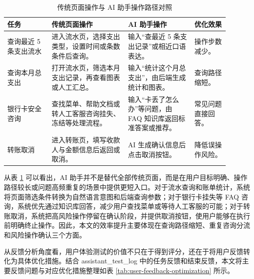 \documentclass[bachelor, print]{xduthesis}
\begin{document}
\begin{table}[H]
    \centering
    \caption{传统页面操作与 AI 助手操作路径对照}
    \label{tab:efficiency-path-comparison}
    \scriptsize
    \setlength{\tabcolsep}{2pt}
    \begin{tabular}{|p{0.18\linewidth}|p{0.31\linewidth}|p{0.27\linewidth}|p{0.14\linewidth}|}
        \hline
        任务 & 传统页面操作 & AI 助手操作 & 优化效果 \\
        \hline
        查询最近 5 条支出流水 & 进入流水页，选择支出类型，设置时间或条数条件后查询。 & 输入“查最近 5 条支出记录”或相近口语表达。 & 操作步数减少。 \\
        \hline
        查询本月总支出 & 打开流水页，筛选本月支出记录，再查看图表或人工汇总。 & 输入“统计这个月总支出”，由后端生成统计和图表。 & 查询路径缩短。 \\
        \hline
        银行卡安全咨询 & 查找菜单、帮助文档或转人工客服咨询挂失、冻结等处理流程。 & 输入“卡丢了怎么办”等问题，由 FAQ 知识库返回标准答案或推荐。 & 常见问题直接回答。 \\
        \hline
        转账取消 & 进入转账页，填写收款人与金额信息后返回或取消。 & AI 生成确认信息后点击取消按钮。 & 降低误操作风险。 \\
        \hline
    \end{tabular}
\end{table}

从表 \ref{tab:efficiency-path-comparison} 可以看出，AI 助手并不是替代全部传统页面，而是在用户目标明确、操作路径较长或问题高频重复的场景中提供更短入口。对于流水查询和账单统计，系统将页面筛选条件转换为自然语言意图和后端查询参数；对于银行卡挂失等 FAQ 咨询，系统优先通过知识库回答，减少用户查找菜单或等待人工客服的可能；对于转账取消，系统把高风险操作停留在确认阶段，并提供取消按钮，使用户能够在执行前明确终止操作。因此，本文的效率提升主要体现在查询路径缩短、重复咨询分流和风险操作确认三个方面。

从反馈分析角度看，用户体验测试的价值不只在于得到评分，还在于将用户反馈转化为具体优化措施。结合 assistant\_test\_log 中的任务反馈和结束反馈，本文将主要反馈问题与对应优化措施整理如表 \ref{tab:user-feedback-optimization} 所示。
\end{document}
